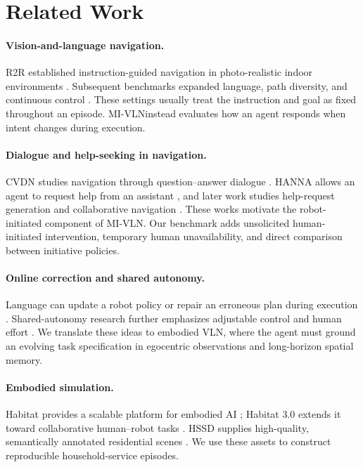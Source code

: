 \documentclass[10pt]{article}
\newcommand{\method}{MI-VLN}
\begin{document}
\section{Related Work}
\label{sec:related}

\paragraph{Vision-and-language navigation.}
R2R established instruction-guided navigation in photo-realistic indoor
environments \cite{anderson2018r2r}. Subsequent benchmarks expanded language,
path diversity, and continuous control
\cite{ku2020rxr,krantz2020beyond,krantz2023iterative}. These settings usually
treat the instruction and goal as fixed throughout an episode. \method instead
evaluates how an agent responds when intent changes during execution.

\paragraph{Dialogue and help-seeking in navigation.}
CVDN studies navigation through question--answer dialogue
\cite{thomason2020cvdn}. HANNA allows an agent to request help from an
assistant \cite{nguyen2019hanna}, and later work studies help-request
generation and collaborative navigation
\cite{zhu2020cmn,zhu2021scoa,taioli2025collaborative}. These works motivate the
robot-initiated component of \method. Our benchmark adds unsolicited
human-initiated intervention, temporary human unavailability, and direct
comparison between initiative policies.

\paragraph{Online correction and shared autonomy.}
Language can update a robot policy or repair an erroneous plan during
execution \cite{broad2017language,sharma2022correcting,cui2023lilac}.
Shared-autonomy research further emphasizes adjustable control and human effort
\cite{beer2014levels}. We translate these ideas to embodied VLN, where the
agent must ground an evolving task specification in egocentric observations
and long-horizon spatial memory.

\paragraph{Embodied simulation.}
Habitat provides a scalable platform for embodied AI
\cite{savva2019habitat}; Habitat 3.0 extends it toward collaborative
human--robot tasks \cite{puig2024habitat3}. HSSD supplies high-quality,
semantically annotated residential scenes \cite{khanna2024hssd}. We use these
assets to construct reproducible household-service episodes.
\end{document}
